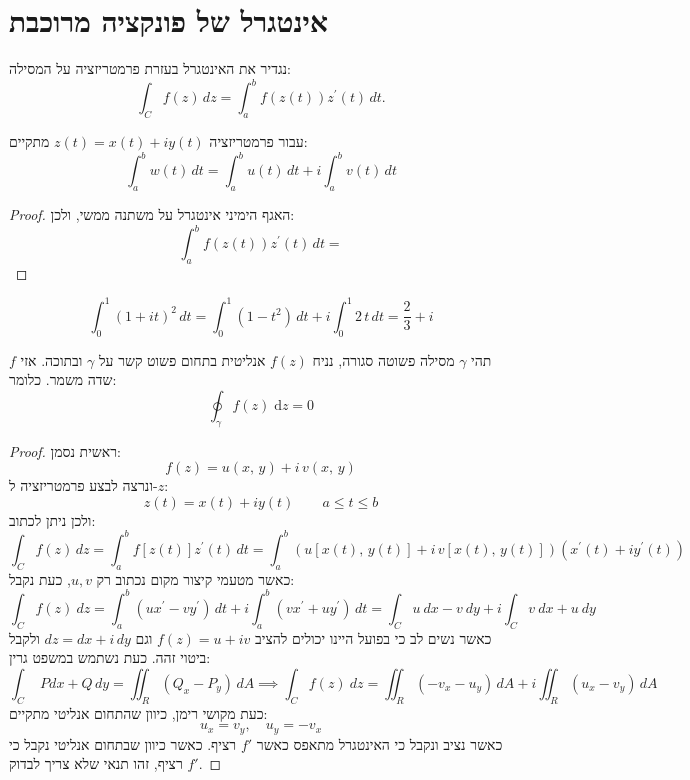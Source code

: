 \documentclass{tstextbook}
\begin{document}
\section{אינטגרל של פונקציה מרוכבת}

\begin{definition}
נגדיר את האינטגרל בעזרת פרמטריזציה על המסילה:
$$\int_{C}f(z)\,d z=\int_{a}^{b}f\left(z(t)\right)z^{\prime}(t)\,d t.$$

\end{definition}
\begin{proposition}
עבור פרמטריזציה \(z(t)=x(t)+iy(t)\) מתקיים:
$$\int_{a}^{b}w(t)\,d t=\int_{a}^{b}u(t)\,d t+i\int_{a}^{b}v(t)\,d t$$

\end{proposition}
\begin{proof}
האגף הימיני אינטגרל על משתנה ממשי, ולכן:
$$\int_{a}^{b}f\left(z(t)\right)z^{\prime}(t)\,d t=$$

\end{proof}
\begin{example}
$$\int_{0}^{1}(1+i t)^{2}\,d t=\int_{0}^{1}(1-t^{2})\,d t+i\int_{0}^{1}2\,t\,d t={\frac{2}{3}}+i$$

\end{example}
\begin{theorem}
תהי \(\gamma\) מסילה פשוטה סגורה, נניח \(f(z)\) אנליטית בתחום פשוט קשר על \(\gamma\) ובתוכה. אזי \(f\) שדה משמר. כלומר:
$$\oint_{\gamma}f(z)\;\mathrm{d}z=0$$

\end{theorem}
\begin{proof}
ראשית נסמן:
$$f(z)=u(x,\,y)+i\,v(x,\,y)$$
ונרצה לבצע פרמטריזציה ל-\(z\):
$$z(t)=x(t)+i y(t) \qquad  a\leq t\leq b$$
ולכן ניתן לכתוב:
$$\int_{C}f(z)\,d z=\int_{a}^{b}f[z(t)]z^{\prime}(t)\,d t= \int_{a}^{b} \left( u\left[ x(t),\,y(t) \right]+i\,v\left[ x(t),\,y(t) \right] \right)(x^{\prime}(t)+i y^{\prime}(t))$$
כאשר מטעמי קיצור מקום נכתוב רק \(u,v\), כעת נקבל:
$$\int_{C}f(z)\ d z=\int_{a}^{b}(u x^{\prime}-v y^{\prime})\,d t+i\int_{a}^{b}(v x^{\prime}+u y^{\prime})\,d t=\int_{C}u\ d x-v\ d y+i\int_{C}v\ d x+u\ d y$$
כאשר נשים לב כי בפועל היינו יכולים להציב \(f(z)=u+iv\) וגם \(dz=dx+i\,dy\) ולקבל ביטוי זהה.
כעת נשתמש במשפט גרין:
$$\int_{C}\,\,P d x+Q\,d y=\iint_{R}(Q_{x}-P_{y})\,d A \implies \int_{C}f(z)\ d z=\iint_{R}(-v_{x}-u_{y})\,d A+i\iint_{R}(u_{x}-v_{y})\,d A$$
כעת מקושי רימן, כיוון שהתחום אנליטי מתקיים:
$$u_{x}=v_{y},\quad u_{y}=-v_{x}$$
כאשר נציב ונקבל כי האינטגרל מתאפס כאשר \(f'\) רציף. כאשר כיוון שבתחום אנליטי נקבל כי \(f'\) רציף, זהו תנאי שלא צריך לבדוק.

\end{proof}
\end{document}
